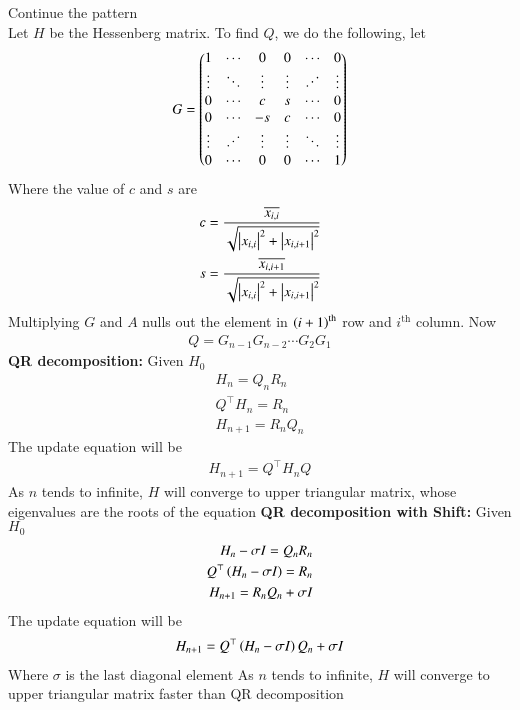 \documentclass[journal]{IEEEtran}
\begin{document}
Continue the pattern\\
Let $H$ be the Hessenberg matrix. To find $Q$, we do the following, let
\begin{align}
G = \myvec{
1 & \cdots & 0 & 0 & \cdots & 0 \\
\vdots & \ddots & \vdots & \vdots & \reflectbox{$\ddots$} & \vdots \\
0 & \cdots & c & s & \cdots & 0\\
0 & \cdots & -s & c & \cdots & 0\\
\vdots & \reflectbox{$\ddots$} & \vdots & \vdots & \ddots & \vdots\\
0 & \cdots & 0 & 0 & \cdots & 1
}
\end{align}
Where the value of $c$ and $s$ are
\begin{align}
	c = \frac{\overline{x_{i,i}}}{\sqrt{\left\vert x_{i,i}\right\vert^2+\left\vert x_{i,i+1}\right\vert^2}}\\
	s = \frac{\overline{x_{i,i+1}}}{\sqrt{\left\vert x_{i,i}\right\vert^2+\left\vert x_{i,i+1}\right\vert^2}}
\end{align}
Multiplying $G$ and $A$ nulls out the element in $\left(i+1\right)^{\text{th}}$ row and $i^\text{th}$ column. Now
\begin{align}
	Q = G_{n-1}G_{n-2}\cdots G_2G_1
\end{align}
\newline
\textbf{QR decomposition:}\newline
Given $H_0$
\begin{align}
	H_n = Q_nR_n\\
	Q^\top H_n = R_n\\
	H_{n+1} = R_nQ_n
\end{align}
The update equation will be
\begin{align}
	H_{n+1} = Q^\top H_n Q
\end{align}
As $n$ tends to infinite, $H$ will converge to upper triangular matrix, whose eigenvalues are the roots of the equation\newline
\textbf{QR decomposition with Shift:}\newline
Given $H_0$
\begin{align}
	H_n - \sigma I = Q_nR_n\\
	Q^\top\left(H_n - \sigma I\right) = R_n\\
	H_{n+1} = R_nQ_n + \sigma I
\end{align}
The update equation will be
\begin{align}
H_{n+1} = Q^\top\left(H_n - \sigma I\right)Q_n + \sigma I
\end{align}
Where $\sigma$ is the last diagonal element
As $n$ tends to infinite, $H$ will converge to upper triangular matrix faster than QR decomposition
\end{document}
